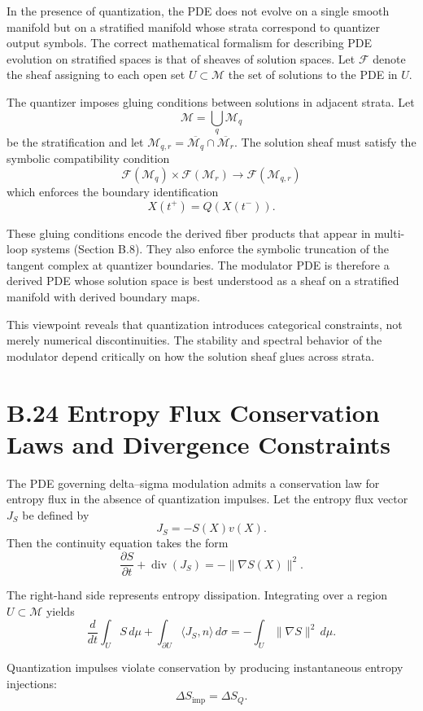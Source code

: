 In the presence of quantization, the PDE does not evolve on a single smooth manifold but on a stratified manifold whose strata correspond to quantizer output symbols. The correct mathematical formalism for describing PDE evolution on stratified spaces is that of sheaves of solution spaces. Let \(\mathcal{F}\) denote the sheaf assigning to each open set \(U\subset \mathcal{M}\) the set of solutions to the PDE in \(U\).

The quantizer imposes gluing conditions between solutions in adjacent strata. Let
\[
\mathcal{M} = \bigcup_{q} \mathcal{M}_{q}
\]
be the stratification and let \(\mathcal{M}_{q,r} = \overline{\mathcal{M}_{q}} \cap \overline{\mathcal{M}_{r}}\). The solution sheaf must satisfy the symbolic compatibility condition
\[
\mathcal{F}(\mathcal{M}_{q}) \times \mathcal{F}(\mathcal{M}_{r})
\longrightarrow
\mathcal{F}(\mathcal{M}_{q,r})
\]
which enforces the boundary identification
\[
X(t^{+}) = Q(X(t^{-})).
\]

These gluing conditions encode the derived fiber products that appear in multi-loop systems (Section B.8). They also enforce the symbolic truncation of the tangent complex at quantizer boundaries. The modulator PDE is therefore a derived PDE whose solution space is best understood as a sheaf on a stratified manifold with derived boundary maps.

This viewpoint reveals that quantization introduces categorical constraints, not merely numerical discontinuities. The stability and spectral behavior of the modulator depend critically on how the solution sheaf glues across strata.

\section{B.24 Entropy Flux Conservation Laws and Divergence Constraints}

The PDE governing delta–sigma modulation admits a conservation law for entropy flux in the absence of quantization impulses. Let the entropy flux vector \(J_{S}\) be defined by
\[
J_{S} = -S(X) v(X).
\]
Then the continuity equation takes the form
\[
\frac{\partial S}{\partial t}
+ \operatorname{div}(J_{S})
= -\|\nabla S(X)\|^{2}.
\]

The right-hand side represents entropy dissipation. Integrating over a region \(U\subset\mathcal{M}\) yields
\[
\frac{d}{dt}\int_{U} S \, d\mu
+ \int_{\partial U} \langle J_{S}, n \rangle\, d\sigma
= -\int_{U}\|\nabla S\|^{2}\, d\mu.
\]

Quantization impulses violate conservation by producing instantaneous entropy injections:
\[
\Delta S_{\text{imp}} = \Delta S_{Q}.
\]

